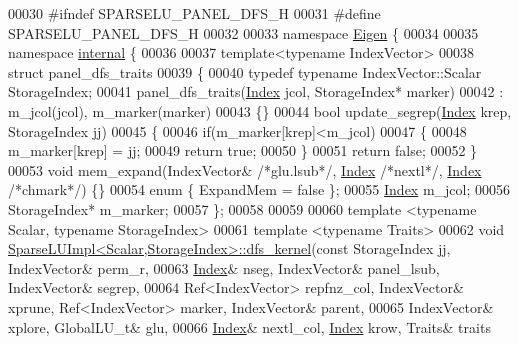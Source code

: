 \begin{DoxyCode}
00030 \textcolor{preprocessor}{#ifndef SPARSELU\_PANEL\_DFS\_H}
00031 \textcolor{preprocessor}{#define SPARSELU\_PANEL\_DFS\_H}
00032 
00033 \textcolor{keyword}{namespace }\hyperlink{namespace_eigen}{Eigen} \{
00034 
00035 \textcolor{keyword}{namespace }\hyperlink{namespaceinternal}{internal} \{
00036   
00037 \textcolor{keyword}{template}<\textcolor{keyword}{typename} IndexVector>
00038 \textcolor{keyword}{struct }panel\_dfs\_traits
00039 \{
00040   \textcolor{keyword}{typedef} \textcolor{keyword}{typename} IndexVector::Scalar StorageIndex;
00041   panel\_dfs\_traits(\hyperlink{namespace_eigen_a62e77e0933482dafde8fe197d9a2cfde}{Index} jcol, StorageIndex* marker)
00042     : m\_jcol(jcol), m\_marker(marker)
00043   \{\}
00044   \textcolor{keywordtype}{bool} update\_segrep(\hyperlink{namespace_eigen_a62e77e0933482dafde8fe197d9a2cfde}{Index} krep, StorageIndex jj)
00045   \{
00046     \textcolor{keywordflow}{if}(m\_marker[krep]<m\_jcol)
00047     \{
00048       m\_marker[krep] = jj; 
00049       \textcolor{keywordflow}{return} \textcolor{keyword}{true};
00050     \}
00051     \textcolor{keywordflow}{return} \textcolor{keyword}{false};
00052   \}
00053   \textcolor{keywordtype}{void} mem\_expand(IndexVector& \textcolor{comment}{/*glu.lsub*/}, \hyperlink{namespace_eigen_a62e77e0933482dafde8fe197d9a2cfde}{Index} \textcolor{comment}{/*nextl*/}, \hyperlink{namespace_eigen_a62e77e0933482dafde8fe197d9a2cfde}{Index} \textcolor{comment}{/*chmark*/}) \{\}
00054   \textcolor{keyword}{enum} \{ ExpandMem = \textcolor{keyword}{false} \};
00055   \hyperlink{namespace_eigen_a62e77e0933482dafde8fe197d9a2cfde}{Index} m\_jcol;
00056   StorageIndex* m\_marker;
00057 \};
00058 
00059 
00060 \textcolor{keyword}{template} <\textcolor{keyword}{typename} Scalar, \textcolor{keyword}{typename} StorageIndex>
00061 \textcolor{keyword}{template} <\textcolor{keyword}{typename} Traits>
00062 \textcolor{keywordtype}{void} \hyperlink{class_sparse_l_u_impl}{SparseLUImpl<Scalar,StorageIndex>::dfs\_kernel}(\textcolor{keyword}{const} 
      StorageIndex jj, IndexVector& perm\_r,
00063                    \hyperlink{namespace_eigen_a62e77e0933482dafde8fe197d9a2cfde}{Index}& nseg, IndexVector& panel\_lsub, IndexVector& segrep,
00064                    Ref<IndexVector> repfnz\_col, IndexVector& xprune, Ref<IndexVector> marker, IndexVector& 
      parent,
00065                    IndexVector& xplore, GlobalLU\_t& glu,
00066                    \hyperlink{namespace_eigen_a62e77e0933482dafde8fe197d9a2cfde}{Index}& nextl\_col, \hyperlink{namespace_eigen_a62e77e0933482dafde8fe197d9a2cfde}{Index} krow, Traits& traits

\end{DoxyCode}
